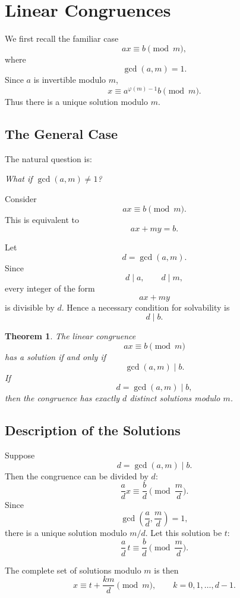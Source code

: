 \documentclass[11pt]{article}
\newtheorem{theorem}{Theorem}[section]
\theoremstyle{remark}
\DeclareMathOperator{\gcdop}{gcd}
\newcommand{\phiE}{\varphi}
\begin{document}
\section{Linear Congruences}

We first recall the familiar case
\[
    ax\equiv b\pmod m,
\]
where
\[
    \gcdop(a,m)=1.
\]
Since $a$ is invertible modulo $m$,
\[
    x\equiv a^{\phiE(m)-1}b\pmod m.
\]
Thus there is a unique solution modulo $m$.

\subsection{The General Case}

The natural question is:

\begin{center}
\emph{What if $\gcdop(a,m)\neq1$?}
\end{center}

Consider
\[
    ax\equiv b\pmod m.
\]
This is equivalent to
\[
    ax+my=b.
\]

Let
\[
    d=\gcdop(a,m).
\]
Since
\[
    d\mid a,\qquad d\mid m,
\]
every integer of the form
\[
    ax+my
\]
is divisible by $d$. Hence a necessary condition for solvability is
\[
    d\mid b.
\]

\begin{theorem}
The linear congruence
\[
    \boxed{ax\equiv b\pmod m}
\]
has a solution if and only if
\[
    \boxed{\gcdop(a,m)\mid b.}
\]
If
\[
    d=\gcdop(a,m)\mid b,
\]
then the congruence has exactly $d$ distinct solutions modulo $m$.
\end{theorem}

\subsection{Description of the Solutions}

Suppose
\[
    d=\gcdop(a,m)\mid b.
\]
Then the congruence can be divided by $d$:
\[
    \frac ad x
    \equiv
    \frac bd
    \pmod{\frac md}.
\]
Since
\[
    \gcdop\!\left(\frac ad,\frac md\right)=1,
\]
there is a unique solution modulo $m/d$. Let this solution be $t$:
\[
    \frac ad\,t
    \equiv
    \frac bd
    \pmod{\frac md}.
\]

The complete set of solutions modulo $m$ is then
\[
    \boxed{
    x\equiv t+\frac{km}{d}\pmod m,
    \qquad
    k=0,1,\ldots,d-1.
    }
\]
\end{document}

